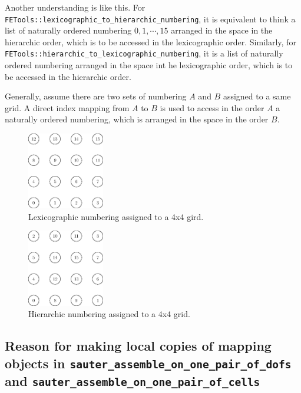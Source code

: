\documentclass[11pt, a4paper]{article}
\begin{document}
Another understanding is like this. For \texttt{FETools::lexicographic\_to\_hierarchic\_numbering}, it is equivalent to think a list of naturally ordered numbering \(0,1,\cdots,15\) arranged in the space in the hierarchic order, which is to be accessed in the lexicographic order. Similarly, for \texttt{FETools::hierarchic\_to\_lexicographic\_numbering}, it is a list of naturally ordered numbering arranged in the space int he lexicographic order, which is to be accessed in the hierarchic order.

Generally, assume there are two sets of numbering \(A\) and \(B\) assigned to a same grid. A direct index mapping from \(A\) to \(B\) is used to access in the order \(A\) a naturally ordered numbering, which is arranged in the space in the order \(B\).

\begin{figure}[htbp]
\centering
\includegraphics[width=0.3\textwidth]{figures/2022-05-25-lexicographic-numbering.eps}
\caption{Lexicographic numbering assigned to a 4x4 gird.}
\end{figure}

\begin{figure}[htbp]
\centering
\includegraphics[width=0.3\textwidth]{figures/2022-05-25-hierarchic-numbering.eps}
\caption{Hierarchic numbering assigned to a 4x4 grid.}
\end{figure}

\subsection{Reason for making local copies of mapping objects in
  \texttt{sauter\_assemble\_on\_one\_pair\_of\_dofs} and
  \texttt{sauter\_assemble\_on\_one\_pair\_of\_cells}}
\end{document}

